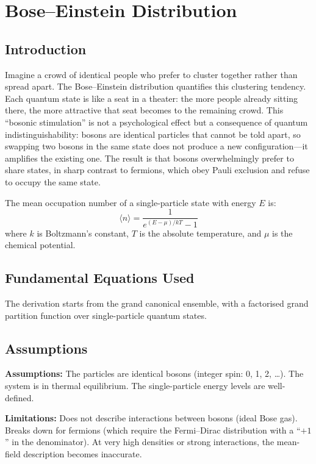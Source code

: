 \chapter{Bose--Einstein Distribution}

\section*{Introduction}

Imagine a crowd of identical people who prefer to cluster together rather than spread apart. The Bose--Einstein distribution quantifies this clustering tendency. Each quantum state is like a seat in a theater: the more people already sitting there, the more attractive that seat becomes to the remaining crowd. This ``bosonic stimulation'' is not a psychological effect but a consequence of quantum indistinguishability: bosons are identical particles that cannot be told apart, so swapping two bosons in the same state does not produce a new configuration---it amplifies the existing one. The result is that bosons overwhelmingly prefer to share states, in sharp contrast to fermions, which obey Pauli exclusion and refuse to occupy the same state.


The mean occupation number of a single-particle state with energy $E$ is:
\[
\langle n \rangle = \frac{1}{e^{(E - \mu)/kT} - 1}
\]
where $k$ is Boltzmann's constant, $T$ is the absolute temperature, and $\mu$ is the chemical potential.

\section*{Fundamental Equations Used}

The derivation starts from the grand canonical ensemble, with a factorised grand partition function over single-particle quantum states.

\section*{Assumptions}

\textbf{Assumptions:} The particles are identical bosons (integer spin: 0, 1, 2, \ldots). The system is in thermal equilibrium. The single-particle energy levels are well-defined.


\textbf{Limitations:} Does not describe interactions between bosons (ideal Bose gas). Breaks down for fermions (which require the Fermi--Dirac distribution with a ``$+1$'' in the denominator). At very high densities or strong interactions, the mean-field description becomes inaccurate.


